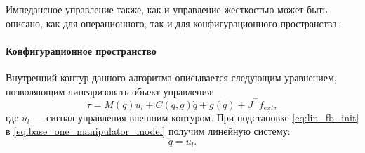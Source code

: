 Импедансное управление также, как и управление жесткостью может быть описано, как для операционного, так и для конфигурационного пространства.
\paragraph{Конфигурационное пространство} Внутренний контур данного алгоритма описывается следующим уравнением, позволяющим линеаризовать объект управления:
\begin{equation}
   \tau = M(q)u_l + C(q,\dot{q})\dot{q} + g(q) + J^\top f_{ext},
   \label{eq:lin_fb_init}
\end{equation}
где $u_l$ --- сигнал управления внешним контуром. При подстановке  \eqref{eq:lin_fb_init} в \eqref{eq:base_one_manipulator_model} получим линейную систему:
\begin{equation}
  \ddot{q} = u_l.
  \label{eq:lin_fb_res}
\end{equation}


